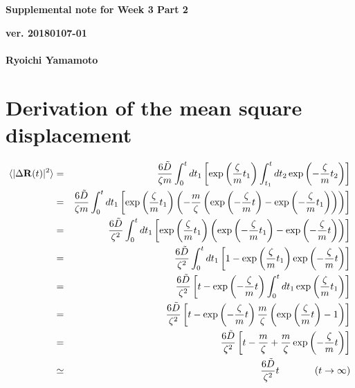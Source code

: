 \documentclass[a4paper,11pt]{article}
\begin{document}
\begin{center}
  {\LARGE\bf Supplemental note for Week 3 Part 2}
  \end{center}
\begin{flushright}
  {\large\bf ver. 20180107-01}\\
 \ \\
{\large\bf Ryoichi Yamamoto}\\
\end{flushright}

\section{Derivation of the mean square displacement}

\begin{eqnarray}
\langle |\Delta {\bf R}(t)|^2\rangle 
&=&\frac{6\tilde{D}}{\zeta m}
\int_{0}^{t}d t_1 \left[ \exp\left(\frac{\zeta}{m}t_1\right)
\int_{t_1}^{t}d t_2 \exp\left(-\frac{\zeta}{m}t_2\right)\right]\\
&=&\frac{6\tilde{D}}{\zeta m}
\int_{0}^{t}d t_1
\left[
\exp
\left(\frac{\zeta}{m}t_1\right)
\left(-\frac{m}{\zeta}\left(
\exp\left(-\frac{\zeta}{m}t\right)
-\exp\left(-\frac{\zeta}{m}t_1\right)
\right)
\right)
\right]\\
&=&\frac{6\tilde{D}}{\zeta^2}
\int_{0}^{t}d t_1
\left[
\exp
\left(\frac{\zeta}{m}t_1\right)
\left(
\exp\left(-\frac{\zeta}{m}t_1\right)
-\exp\left(-\frac{\zeta}{m}t\right)
\right)
\right]
\\
&=&\frac{6\tilde{D}}{\zeta^2}
\int_{0}^{t}d t_1
\left[
1-
\exp
\left(\frac{\zeta}{m}t_1\right)
\exp\left(-\frac{\zeta}{m}t\right)
\right]
\\
&=&\frac{6\tilde{D}}{\zeta^2}
\left[
t-
\exp
\left(-\frac{\zeta}{m}t\right)
\int_{0}^{t}d t_1
\exp\left(\frac{\zeta}{m}t_1\right)
\right]
\\
&=&\frac{6\tilde{D}}{\zeta^2}
\left[
t-
\exp
\left(-\frac{\zeta}{m}t\right)
\frac{m}{\zeta}
\left(
\exp\left(\frac{\zeta}{m}t\right)-1\right)
\right]
\\
&=&\frac{6\tilde{D}}{\zeta^2}
\left[
t-\frac{m}{\zeta}+\frac{m}{\zeta}\exp\left(-\frac{\zeta}{m}t\right)
\right]
\\
&\simeq&
\frac{6\tilde{D}}{\zeta^2}t\ \ \ \ \ \ \ \ \ \ \ (t\rightarrow\infty)
\end{eqnarray}
\end{document}
